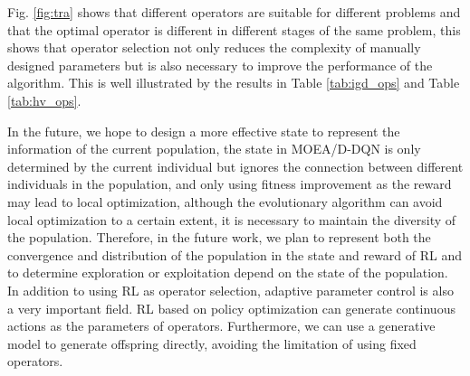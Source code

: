 \documentclass[journal]{IEEEtran}
\begin{document}
Fig. \ref{fig:tra} shows that different operators are suitable for different problems and that the optimal operator is different in different stages of the same problem, this shows that operator selection not only reduces the complexity of manually designed parameters but is also necessary to improve the performance of the algorithm.
This is well illustrated by the results in Table \ref{tab:igd_ops} and Table \ref{tab:hv_ops}.

In the future, we hope to design a more effective state to represent the information of the current population, the state in MOEA/D-DQN is only determined by the current individual but ignores the connection between different individuals in the population, and only using fitness improvement as the reward may lead to local optimization, although the evolutionary algorithm can avoid local optimization to a certain extent, it is necessary to maintain the diversity of the population. Therefore, in the future work, we plan to represent both the convergence and distribution of the population in the state and reward of RL and to determine exploration or exploitation depend on the state of the population.
In addition to using RL as operator selection, adaptive parameter control is also a very important field. RL based on policy optimization can generate continuous actions as the parameters of operators. Furthermore, we can use a generative model to generate offspring directly, avoiding the limitation of using fixed operators.


\ifCLASSOPTIONcaptionsoff
  \newpage
\fi



\end{document}
